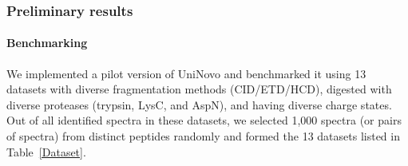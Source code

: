 \subsubsection{Preliminary results}


\paragraph{Benchmarking} 

We implemented a pilot version of UniNovo and  benchmarked it using 13 datasets with diverse fragmentation methods (CID/ETD/HCD), digested with diverse proteases (trypsin, LysC, and AspN), and having diverse charge states. 
Out of all identified spectra in these datasets, we selected 1,000 spectra (or pairs of spectra) from distinct peptides randomly and formed the 13 datasets listed in Table~\ref{Dataset}. 

 








